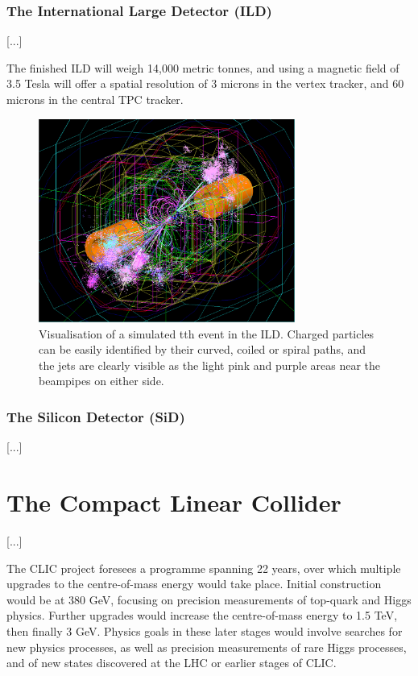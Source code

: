 \subsubsection{The International Large Detector (ILD)}
[...]

The finished ILD will weigh 14,000 metric tonnes, and using a magnetic field of 3.5 Tesla will offer a spatial resolution of 3 microns in the vertex tracker, and 60 microns in the central TPC tracker. 

\begin{figure}[h]
	\centering
	\includegraphics[width=0.75\textwidth]{../Pictures/SimulatedEvent1.png}
	\caption{Visualisation of a simulated tth event in the ILD. Charged particles can be easily identified by their curved, coiled or spiral paths, and the jets are clearly visible as the light pink and purple areas near the beampipes on either side.}
	\label{figure:colliders/ILD/tth-simulation}
\end{figure}

\subsubsection{The Silicon Detector (SiD)}
[...]

\section{The Compact Linear Collider}
[...]

The CLIC project foresees a programme spanning 22 years, over which multiple upgrades to the centre-of-mass energy would take place. Initial construction would be at 380 GeV, focusing on precision measurements of top-quark and Higgs physics. Further upgrades would increase the centre-of-mass energy to 1.5 TeV, then finally 3 GeV. Physics goals in these later stages would involve searches for new physics processes, as well as precision measurements of rare Higgs processes, and of new states discovered at the LHC or earlier stages of CLIC. 

